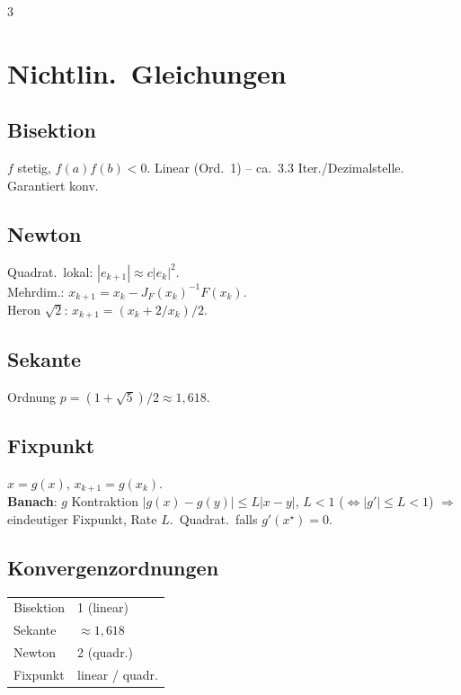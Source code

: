 \documentclass[8pt,a4paper]{extarticle}
\begin{document}
\begin{multicols*}{3}
\section{Nichtlin.\ Gleichungen}
\subsection{Bisektion}
$f$ stetig, $f(a)f(b)<0$. Linear (Ord.\ 1) -- ca.\ 3.3 Iter./Dezimalstelle. Garantiert konv.

\subsection{Newton}
Quadrat.\ lokal: $|e_{k+1}|\!\approx\!c|e_k|^2$.\\
Mehrdim.: $x_{k+1}=x_k-J_F(x_k)^{-1}F(x_k)$.\\
Heron $\sqrt 2$: $x_{k+1}=(x_k+2/x_k)/2$.

\subsection{Sekante}
Ordnung $p=(1{+}\sqrt 5)/2\approx 1{,}618$.

\subsection{Fixpunkt}
$x=g(x)$, $x_{k+1}=g(x_k)$.\\
\textbf{Banach}: $g$ Kontraktion $|g(x){-}g(y)|\!\le\!L|x{-}y|$, $L\!<\!1$ ($\Leftrightarrow|g'|\!\le\!L\!<\!1$) $\Rightarrow$ eindeutiger Fixpunkt, Rate $L$.\ Quadrat.\ falls $g'(x^\star){=}0$.

\subsection{Konvergenzordnungen}
\begin{tabularx}{\linewidth}{@{}l@{\ }X@{}}
Bisektion & 1 (linear) \\
Sekante & $\approx 1{,}618$ \\
Newton & 2 (quadr.) \\
Fixpunkt & linear / quadr. \\
\end{tabularx}


\end{multicols*}
\end{document}
